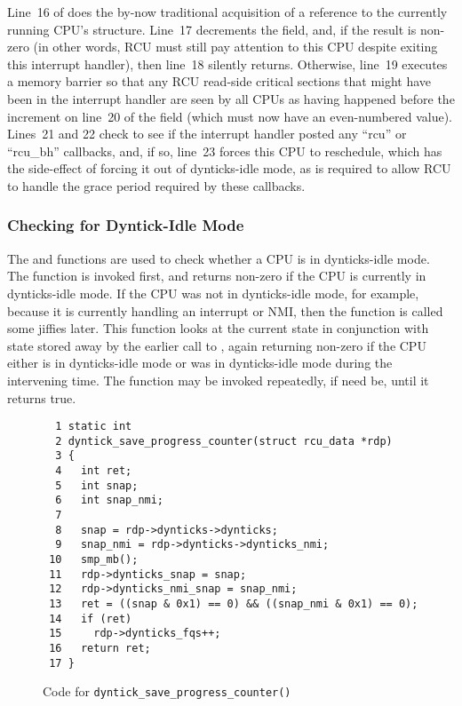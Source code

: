 Line~16 of  does the by-now traditional acquisition
of a reference to the currently running CPU's  structure.
Line~17 decrements the  field, and, if the
result is non-zero (in other words, RCU must still pay attention
to this CPU despite exiting this interrupt handler), then line~18
silently returns.
Otherwise, line~19 executes a memory barrier so that any RCU read-side
critical sections that might have been in the interrupt handler are
seen by all CPUs as having happened before the increment on line~20
of the  field (which must now have an even-numbered
value).
Lines~21 and 22 check to see if the interrupt handler posted any
``rcu'' or ``rcu\_bh'' callbacks, and, if so, line~23 forces this
CPU to reschedule, which has the side-effect of forcing it out of
dynticks-idle mode, as is required to allow RCU to handle the
grace period required by these callbacks.

\subsubsection{Checking for Dyntick-Idle Mode}
\label{app:rcuimpl:rcutreewt:Checking for Dyntick-Idle Mode}

The  and
 functions are used to check
whether a CPU is in dynticks-idle mode.
The  function is invoked first,
and returns non-zero if the CPU is currently in dynticks-idle mode.
If the CPU was not in dynticks-idle mode, for example, because it is
currently handling an interrupt or NMI, then the
 function is called some jiffies later.
This function looks at the current state in conjunction with state
stored away by the earlier call to ,
again returning non-zero if the CPU either is in dynticks-idle mode or
was in dynticks-idle mode during the intervening time.
The  function may be invoked repeatedly,
if need be, until it returns true.

\begin{figure}[tbp]
{ \scriptsize
\begin{verbatim}
  1 static int
  2 dyntick_save_progress_counter(struct rcu_data *rdp)
  3 {
  4   int ret;
  5   int snap;
  6   int snap_nmi;
  7
  8   snap = rdp->dynticks->dynticks;
  9   snap_nmi = rdp->dynticks->dynticks_nmi;
 10   smp_mb();
 11   rdp->dynticks_snap = snap;
 12   rdp->dynticks_nmi_snap = snap_nmi;
 13   ret = ((snap & 0x1) == 0) && ((snap_nmi & 0x1) == 0);
 14   if (ret)
 15     rdp->dynticks_fqs++;
 16   return ret;
 17 }
\end{verbatim}
}
\caption{Code for {\tt dyntick\_\-save\_\-progress\_\-counter()}}
\label{fig:app:rcuimpl:rcutreewt:Code for dyntick-save-progress-counter}
\end{figure}

